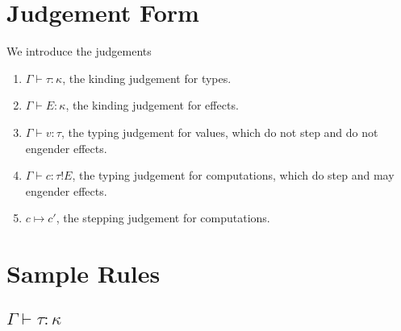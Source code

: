 \documentclass[12pt]{article}
\begin{document}
\newpage
\section{Judgement Form}

We introduce the judgements
\begin{enumerate}
\item $\Gamma \vdash \tau : \kappa$, the kinding judgement for types.
\item $\Gamma \vdash E : \kappa$, the kinding judgement for effects.
\item $\Gamma \vdash v : \tau$, the typing judgement for values, which do not
step and do not engender effects.
\item $\Gamma \vdash c : \tau!E$, the typing judgement for computations, which
do step and may engender effects.
\item $c \mapsto c'$, the stepping judgement for computations.
\end{enumerate}

\newpage
\section{Sample Rules}

\subsection{$\Gamma \vdash \tau : \kappa$}
\end{document}
